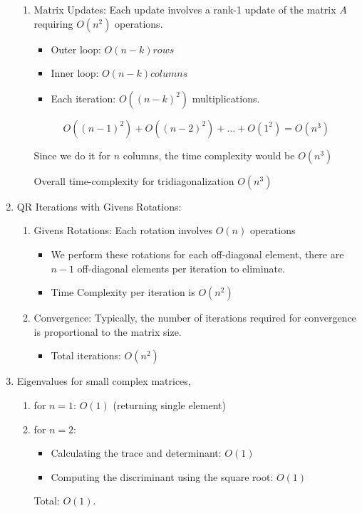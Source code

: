 \documentclass{article}
\theoremstyle{remark}
\begin{document}
\begin{enumerate}
\begin{enumerate}
            \item Matrix Updates: Each update involves a rank-1 update of the matrix $A$ requiring $O(n^2)$ operations.

            \begin{itemize}
                \item Outer loop: $O(n-k) rows$
                \item Inner loop: $O(n-k) columns$
                \item Each iteration: $O((n-k)^2)$ multiplications.
            \end{itemize}

            $$O((n-1)^2)+O((n-2)^2) + \ldots + O(1^2)=O(n^3)$$

            Since we do it for $n$ columns, the time complexity would be $O(n^3)$

            Overall time-complexity for tridiagonalization $O(n^3)$
        \end{enumerate}

    \item QR Iterations with Givens Rotations: 
        \begin{enumerate}
            \item Givens Rotations: Each rotation involves $O(n)$ operations
                \begin{itemize}
                    \item We perform these rotations for each off-diagonal element, there are $n-1$ off-diagonal elements per iteration to eliminate.

                    \item Time Complexity per iteration is $O(n^2)$
                \end{itemize}

            \item Convergence: Typically, the number of iterations required for convergence is proportional to the matrix size. 
                \begin{itemize}
                    \item Total iterations: $O(n^2)$
                \end{itemize}
        \end{enumerate}

    \item Eigenvalues for small complex matrices,
    \begin{enumerate}
        \item for $n=1$: $O(1)$ (returning single element)

        \item for $n=2$:

        \begin{itemize}
            \item Calculating the trace and determinant: $O(1)$
            \item Computing the discriminant using the square root: $O(1)$
        \end{itemize}

        Total: $O(1)$.
    \end{enumerate}
    
\end{enumerate}
\end{document}

